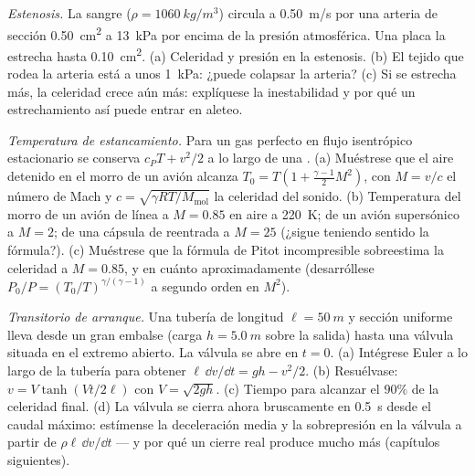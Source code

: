 \begin{exercise}[$\star\star$]\label{exo:b2:euler-bernoulli:9}
\emph{Estenosis.} La sangre ($\rho = \qty{1060}{kg/m^3}$) circula a
\qty{0.50}{m/s} por una arteria de sección \qty{0.50}{cm^2} a \qty{13}{kPa}
por encima de la presión atmosférica. Una placa la estrecha hasta
\qty{0.10}{cm^2}. (a) Celeridad y presión en la estenosis. (b) El tejido
que rodea la arteria está a unos \qty{1}{kPa}: ¿puede colapsar la arteria?
(c) Si se estrecha más, la celeridad crece aún más: explíquese la inestabilidad y por qué un estrechamiento así puede entrar en aleteo.
\end{exercise}

\begin{exercise}[$\star\star\star$]\label{exo:b2:euler-bernoulli:10}
\emph{Temperatura de estancamiento.} Para un gas perfecto en flujo
isentrópico estacionario se conserva $c_PT + v^2/2$ a lo largo de una . (a) Muéstrese que el aire detenido en el morro de un avión alcanza $T_0 = T(1 +
\tfrac{\gamma - 1}{2}M^2)$, con $M = v/c$ el número de Mach y $c =
\sqrt{\gamma RT/M_{\text{mol}}}$ la celeridad del sonido. (b) Temperatura
del morro de un avión de línea a $M = 0.85$ en aire a \qty{220}{K}; de un
avión supersónico a $M = 2$; de una cápsula de reentrada a $M = 25$
(¿sigue teniendo sentido la fórmula?). (c) Muéstrese que la fórmula de
Pitot incompresible sobreestima la celeridad a $M = 0.85$, y en cuánto
aproximadamente (desarróllese $P_0/P = (T_0/T)^{\gamma/(\gamma - 1)}$ a segundo orden en $M^2$).
\end{exercise}

\begin{exercise}[$\star\star\star$]\label{exo:b2:euler-bernoulli:11}
\emph{Transitorio de arranque.} Una tubería de longitud $\ell = \qty{50}{m}$
y sección uniforme lleva desde un gran embalse (carga $h = \qty{5.0}{m}$
sobre la salida) hasta una válvula situada en el extremo abierto. La
válvula se abre en $t = 0$. (a) Intégrese Euler a lo largo de la tubería
para obtener $\ell\,\dd v/\dd t = gh - v^2/2$. (b) Resuélvase:
$v = V\tanh(Vt/2\ell)$ con $V = \sqrt{2gh}$. (c) Tiempo para alcanzar el
$90\%$ de la celeridad final. (d) La válvula se cierra ahora bruscamente
en \qty{0.5}{s} desde el caudal máximo: estímense la deceleración media y
la sobrepresión en la válvula a partir de $\rho\ell\,\dd v/\dd t$ --- y por
qué un cierre real produce mucho más (capítulos siguientes).
\end{exercise}

